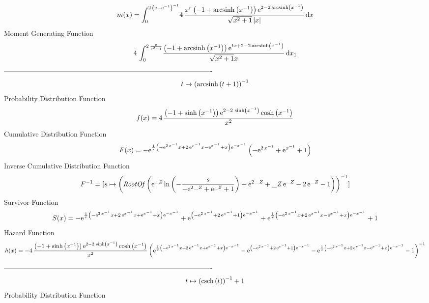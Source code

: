 \documentclass[12pt]{article}
\begin{document}
 $$ m(x) = \int_{0}^{2\, \left( {\rm e}-{{\rm e}^{-1}} \right) ^{-1}}\!4\,{\frac 
{{x}^{r} \left( -1+{\rm arcsinh} \left({x}^{-1}\right) \right) {
{\rm e}^{2-2\,{\rm arcsinh} \left({x}^{-1}\right)}}}{\sqrt {{x}^{2}+1}
 \left| x \right| }}\,{\rm d}x
$$ Moment Generating Function 
 $$4\,\int_{0}^{2\,{\frac {{\rm e}}{{{\rm e}^{2}}-1}}}\!{\frac { \left( -
1+{\rm arcsinh} \left({x}^{-1}\right) \right) {{\rm e}^{tx+2-2\,
{\rm arcsinh} \left({x}^{-1}\right)}}}{\sqrt {{x}^{2}+1}x}}\,{\rm d}x_
{{1}}
$$-------------------------------------------------------------------------------------------  \\$$t\mapsto  \left( {\rm arcsinh} \left(t+1\right) \right) ^{-1}
$$Probability Distribution Function 
$$  f(x)=4\,{\frac { \left( -1+\sinh \left( {x}^{-1} \right)  \right) {{\rm e}^
{2-2\,\sinh \left( {x}^{-1} \right) }}\cosh \left( {x}^{-1} \right) }{
{x}^{2}}}
$$Cumulative Distribution Function  
 $$F(x)=-{{\rm e}^{{\frac {1}{x} \left( -{{\rm e}^{2\,{x}^{-1}}}x+2\,{{\rm e}^
{{x}^{-1}}}x-{{\rm e}^{{x}^{-1}}}+x \right) {{\rm e}^{-{x}^{-1}}}}}}
 \left( -{{\rm e}^{2\,{x}^{-1}}}+{{\rm e}^{{x}^{-1}}}+1 \right) 
$$ Inverse Cumulative Distribution Function 
  $$F^{-1} = [s\mapsto  \left( {\it RootOf} \left( {{\rm e}^{{\it \_Z}}}\ln 
 \left( -{\frac {s}{-{{\rm e}^{2\,{\it \_Z}}}+{{\rm e}^{{\it \_Z}}}+1}
} \right) +{{\rm e}^{2\,{\it \_Z}}}+{\it \_Z}\,{{\rm e}^{{\it \_Z}}}-2
\,{{\rm e}^{{\it \_Z}}}-1 \right)  \right) ^{-1}]
$$Survivor Function 
 $$ S(x)=-{{\rm e}^{{\frac {1}{x} \left( -{{\rm e}^{2\,{x}^{-1}}}x+2\,{{\rm e}^
{{x}^{-1}}}x+{{\rm e}^{{x}^{-1}}}+x \right) {{\rm e}^{-{x}^{-1}}}}}}+{
{\rm e}^{ \left( -{{\rm e}^{2\,{x}^{-1}}}+2\,{{\rm e}^{{x}^{-1}}}+1
 \right) {{\rm e}^{-{x}^{-1}}}}}+{{\rm e}^{{\frac {1}{x} \left( -{
{\rm e}^{2\,{x}^{-1}}}x+2\,{{\rm e}^{{x}^{-1}}}x-{{\rm e}^{{x}^{-1}}}+
x \right) {{\rm e}^{-{x}^{-1}}}}}}+1
$$ Hazard Function 
 $$ h(x)=-4\,{\frac { \left( -1+\sinh \left( {x}^{-1} \right)  \right) {{\rm e}
^{2-2\,\sinh \left( {x}^{-1} \right) }}\cosh \left( {x}^{-1} \right) 
}{{x}^{2}} \left( {{\rm e}^{{\frac {1}{x} \left( -{{\rm e}^{2\,{x}^{-1
}}}x+2\,{{\rm e}^{{x}^{-1}}}x+{{\rm e}^{{x}^{-1}}}+x \right) {{\rm e}^
{-{x}^{-1}}}}}}-{{\rm e}^{ \left( -{{\rm e}^{2\,{x}^{-1}}}+2\,{{\rm e}
^{{x}^{-1}}}+1 \right) {{\rm e}^{-{x}^{-1}}}}}-{{\rm e}^{{\frac {1}{x}
 \left( -{{\rm e}^{2\,{x}^{-1}}}x+2\,{{\rm e}^{{x}^{-1}}}x-{{\rm e}^{{
x}^{-1}}}+x \right) {{\rm e}^{-{x}^{-1}}}}}}-1 \right) ^{-1}}
$$-------------------------------------------------------------------------------------------  \\$$t\mapsto  \left( {\rm csch} \left(t\right) \right) ^{-1}+1
$$Probability Distribution Function 
\end{document}
